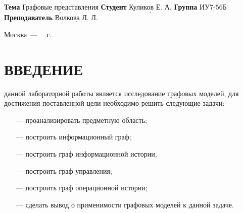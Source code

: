 \documentclass{bmstu}
\begin{document}
\begin{titlepage}
	\noindent\textbf{Тема} 			$\underline{\text{Графовые представления}}$\newline\newline
	\noindent\textbf{Студент} 		$\underline{\text{Куликов Е. А.}}$\newline\newline
	\noindent\textbf{Группа} 		$\underline{\text{ИУ7-56Б}}$\newline\newline
	\noindent\textbf{Преподаватель} $\underline{\text{Волкова Л. Л.}}$\newline

	\begin{center}
		\vfill
		Москва~---~\the\year
		~г.
	\end{center}
	\restoregeometry
\end{titlepage}

\renewcommand{\contentsname}{СОДЕРЖАНИЕ}
\tableofcontents
\setcounter{page}{2}

\chapter*{ВВЕДЕНИЕ}

 данной лабораторной работы является исследование графовых моделей, для достижения поставленной цели необходимо решить следующие задачи:

\begin{itemize}
	\item[---] проанализировать предметную область;
	\item[---] построить информационный граф;
	\item[---] построить граф информационной истории;
        \item[---] построить граф управления;
        \item[---] построить граф операционной истории;
        \item[---] сделать вывод о применимости графовых моделей к данной задаче.
\end{itemize}
\end{document}
